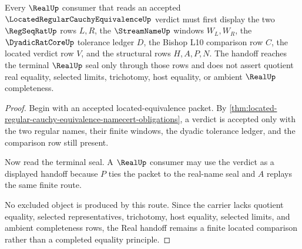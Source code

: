 \begin{theorem}
\label{thm:located-regular-cauchy-equivalence-real-handoff}
Every $\RealUp$ consumer that reads an accepted $\LocatedRegularCauchyEquivalenceUp$ verdict must first display the two $\RegSeqRatUp$ rows $L,R$, the $\StreamNameUp$ windows $W_L,W_R$, the $\DyadicRatCoreUp$ tolerance ledger $D$, the Bishop L10 comparison row $C$, the located verdict row $V$, and the structural rows $H,A,P,N$. The handoff reaches the terminal $\RealUp$ seal only through those rows and does not assert quotient real equality, selected limits, trichotomy, host equality, or ambient $\RealUp$ completeness.
\end{theorem}
\begin{proof}
Begin with an accepted located-equivalence packet. By \autoref{thm:located-regular-cauchy-equivalence-namecert-obligations}, a verdict is accepted only with the two regular names, their finite windows, the dyadic tolerance ledger, and the comparison row still present.

Now read the terminal seal. A $\RealUp$ consumer may use the verdict as a displayed handoff because $P$ ties the packet to the real-name seal and $A$ replays the same finite route.

No excluded object is produced by this route. Since the carrier lacks quotient equality, selected representatives, trichotomy, host equality, selected limits, and ambient completeness rows, the Real handoff remains a finite located comparison rather than a completed equality principle.
\end{proof}


